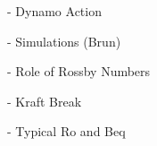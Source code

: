 - Dynamo Action

- Simulations (Brun)

- Role of Rossby Numbers

- Kraft Break
  
- Typical Ro and Beq   
  
  
  
  
  
  
  
  
  
  
  
  
  
  
  
  